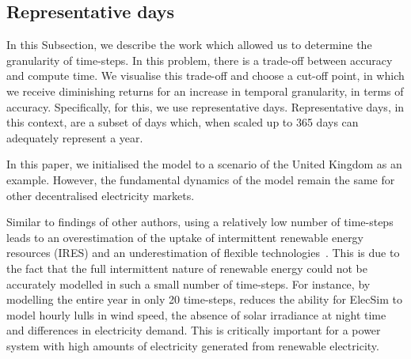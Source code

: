 
\subsection{Representative days}
\label{elecsim:sec:representative}


In this Subsection, we describe the work which allowed us to determine the granularity of time-steps. In this problem, there is a trade-off between accuracy and compute time. We visualise this trade-off and choose a cut-off point, in which we receive diminishing returns for an increase in temporal granularity, in terms of accuracy. Specifically, for this, we use representative days. Representative days, in this context, are a subset of days which, when scaled up to 365 days can adequately represent a year. 

In this paper, we initialised the model to a scenario of the United Kingdom as an example. However, the fundamental dynamics of the model remain the same for other decentralised electricity markets.






Similar to findings of other authors, using a relatively low number of time-steps leads to an overestimation of the uptake of intermittent renewable energy resources (IRES) and an underestimation of flexible technologies~\cite{Haydt2011,Ludig2011}. This is due to the fact that the full intermittent nature of renewable energy could not be accurately modelled in such a small number of time-steps. For instance, by modelling the entire year in only 20 time-steps, reduces the ability for ElecSim to model hourly lulls in wind speed, the absence of solar irradiance at night time and differences in electricity demand. This is critically important for a power system with high amounts of electricity generated from renewable electricity. 


